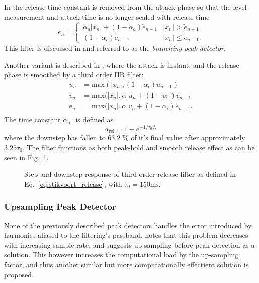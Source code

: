 \documentclass[../main2.tex]{subfiles}
\providecommand{\rootdir}{..}
\begin{document}
In \cite{zolzer2008digital} the release time constant is removed from the attack phase so that the level measurement and attack time is no longer scaled with release time
\begin{equation}
\tilde{e}_n = \begin{cases}
    \alpha_{a} |x_n| + (1-\alpha_{a}) \tilde{e}_{n-1} 	& |x_n| > \tilde{e}_{n-1} \\
    (1-\alpha_{r}) \tilde{e}_{n-1} 					& |x_n| \leq \tilde{e}_{n-1}.
\end{cases}
\end{equation}
This filter is discussed in \cite{reiss2012tutorial} and referred to as the \emph{branching peak detector}.

Another variant is described in \cite{stikvoort1986digital}, where the attack is instant, and the release phase is smoothed by a third order IIR filter:\begin{equation}\label{eq:stikvoort_release}
\begin{split}
u_n &= \text{max}(|x_n|, (1-\alpha_{\text{r}}) u_{n-1}) \\
v_n &= \text{max}(|x_n|, \alpha_{\text{r}} u_n + (1-\alpha_{\text{r}}) v_{n-1} \\
\tilde{e}_n &= \text{max}(|x_n|, \alpha_{\text{r}} v_n + (1-\alpha_{\text{r}}) \tilde{e}_{n-1}. \\
\end{split}
\end{equation}
The time constant $\alpha_{\text{rel}}$ is defined as
\begin{equation}
\alpha_\text{rel} = 1-e^{-1/\tau_0 f_s}
\end{equation}
where the downstep has fallen to 63.2 \% of it's final value after approximately $3.25 \tau_0$. The filter functions as both peak-hold and smooth release effect as can be seen in Fig.~\ref{fig:step_stikvoort_release}.
\begin{figure}
\centerline{}
\caption{Step and downstep response of third order release filter as defined in Eq.~\eqref{eq:stikvoort_release}, with $\tau_0 = 150 \text{ms}$.}
\label{fig:step_stikvoort_release}
\end{figure}

\subsubsection{Upsampling Peak Detector}
None of the previously described peak detectors handles the error introduced by harmonics aliased to the filtering's passband. \cite{frindle1996implementation} notes that this problem decreases with increasing sample rate, and suggests up-sampling before peak detection as a solution. This however increases the computational load by the up-sampling factor, and thus another similar but more computationally effectient solution is proposed.
\end{document}
